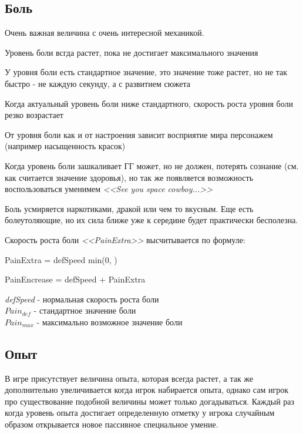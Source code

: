 \documentclass[11pt]{report}
\newenvironment{enumerate*}%
  {\begin{enumerate}%
    \setlength{\itemsep}{2pt}%
    \setlength{\parskip}{0.75pt}}%
  {\end{enumerate}}
\begin{document}
\subsection{Боль}
Очень важная величина с очень интересной механикой. 
\begin{enumerate*}
\item Уровень боли всгда растет, пока не достигает максимального значения
\item У уровня боли есть стандартное значение, это значение тоже растет, но не так быстро - не каждую секунду, а с развитием сюжета
\item Когда актуальный уровень боли ниже стандартного, скорость роста уровня боли резко возрастает
\item От уровня боли как и от настроения зависит восприятие мира персонажем (например насыщенность красок)
\item Когда уровень боли зашкаливает ГГ может, но не должен, потерять сознание (см. как считается значение здоровья), но так же появляется возможность воспользоваться уменимем \textit{<<See you space cowboy...>>} 
\item Боль усмиряется наркотиками, дракой или чем то вкусным. Еще есть болеутоляющие, но их сила ближе уже к середине будет практически бесполезна.
\end{enumerate*}
Скорость роста боли \textit{<<PainExtra>>} высчитывается по формуле: 
\begin{myequation}
	PainExtra = defSpeed \cdot min\left(0, \right)
\end{myequation}
\begin{myequation}
	PainEncrease = defSpeed + PainExtra
\end{myequation}
\textit{defSpeed} - нормальная скорость роста боли\\
\begin{math}
	Pain_{def}
\end{math} - стандартное значение боли \\
\begin{math}
	Pain_{max}
\end{math} - максимально возможное значение боли\\
\subsection{Опыт}
В игре присутствует величина опыта, которая всегда растет, а так же дополнительно увеличивается когда игрок набирается опыта, однако сам игрок про существование подобной величины может только догадываться. Каждый раз когда уровень опыта достигает определенную отметку у игрока случайным образом открывается новое пассивное специальное умение.\\
\end{document}
